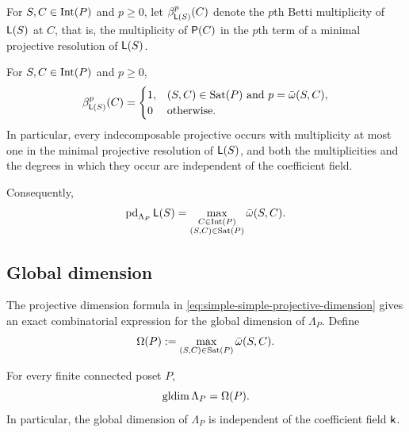 For $S,C\in\operatorname{Int}(P)$ and $p\geq0$, let
$\beta_{\mathsf L(S)}^p(C)$ denote the $p$th Betti multiplicity of $\mathsf L(S)$ at $C$, that is, the multiplicity of $\mathsf P(C)$ in the
$p$th term of a minimal projective resolution of $\mathsf L(S)$.

\begin{corollary}
\label{cor:simple-simple-Betti-projective-dimension}
For $S,C\in\operatorname{Int}(P)$ and $p\geq0$,
\begin{equation}
\label{eq:simple-simple-Betti-multiplicities}
\beta_{\mathsf L(S)}^p(C)
=
\begin{cases}
1,
&
\text{$(S,C)\in \operatorname{Sat}(P)$ and $p=\bar\omega(S,C)$},
\\
0
&
\text{otherwise}.
\end{cases}
\end{equation}
In particular, every indecomposable projective occurs with multiplicity
at most one in the minimal projective resolution of $\mathsf L(S)$, and both
the multiplicities and the degrees in which they occur are independent
of the coefficient field.
\end{corollary}


Consequently,
\begin{equation}
\label{eq:simple-simple-projective-dimension}
\operatorname{pd}_{\Lambda_P}\mathsf L(S)
=
\max_{\substack{
C\in\operatorname{Int}(P)\\
(S,C)\in \operatorname{Sat}(P)
}}
\bar\omega(S,C).
\end{equation}


\subsection{Global dimension}
\label{sec:global-dimension}

The projective dimension formula in \eqref{eq:simple-simple-projective-dimension} gives an exact combinatorial expression
for the global dimension of $\Lambda_P$.  Define
\begin{equation}
\label{eq:global-dimension-combinatorial-invariant}
\Omega(P)
:=
\max_{(S,C)\in\operatorname{Sat}(P)}
\bar\omega(S,C).
\end{equation}

\begin{theorem}
\label{thm:global-dimension-formula}
For every finite connected poset $P$,
\begin{equation}
\label{eq:global-dimension-formula}
\operatorname{gldim}\Lambda_P=\Omega(P).
\end{equation}
In particular, the global dimension of $\Lambda_P$ is independent of the coefficient field $\mathsf{k}$.
\end{theorem}

